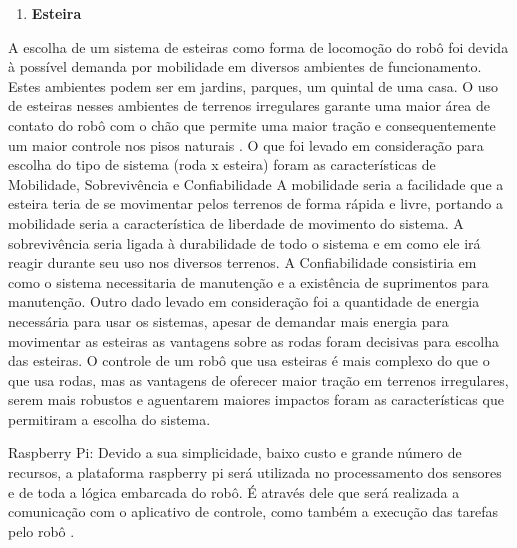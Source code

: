 \begin{enumerate}
  \item \textbf{Esteira}
\end{enumerate}
A escolha de um sistema de esteiras como forma de locomoção do robô foi devida à possível demanda por mobilidade em diversos ambientes de funcionamento. Estes ambientes podem ser em jardins, parques, um quintal de uma casa.  
O uso de esteiras nesses ambientes de terrenos irregulares garante uma maior área de contato do robô com o chão que permite uma maior tração e consequentemente um maior controle nos pisos naturais \cite{bekker:1956}.
O que foi levado em consideração para escolha do tipo de sistema (roda x esteira) foram as características de Mobilidade, Sobrevivência e Confiabilidade \cite{bekker:1956} A mobilidade seria a facilidade que a esteira teria de se movimentar pelos terrenos de forma rápida e livre, portando a mobilidade seria a característica de liberdade de movimento do sistema. A sobrevivência seria ligada à durabilidade de todo o sistema e em como ele irá reagir durante seu uso nos diversos terrenos.  A Confiabilidade consistiria em como o sistema necessitaria de manutenção e a existência de suprimentos para manutenção. Outro dado levado em consideração foi a quantidade de energia necessária para usar os sistemas, apesar de demandar mais energia para movimentar as esteiras as vantagens sobre as rodas foram decisivas para escolha das esteiras.
O controle de um robô que usa esteiras é mais complexo do que o que usa rodas, mas as vantagens de oferecer maior tração em terrenos irregulares, serem mais robustos e aguentarem maiores impactos foram as características que permitiram a escolha do sistema.

  Raspberry Pi: Devido a sua simplicidade, baixo custo e grande número de recursos, a plataforma raspberry pi será utilizada no processamento dos sensores e de toda a lógica embarcada do robô. É através dele que será realizada a comunicação com o aplicativo de controle, como também a execução das tarefas pelo robô \cite{jornalggn:2013}.

